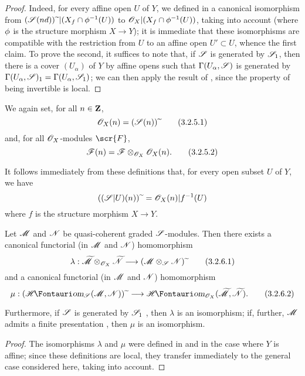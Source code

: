 \begin{proof}
Indeed, for every affine open $U$ of $Y$, we defined in  a canonical isomorphism from $(\mathscr{S}(nd)){\,\widetilde{\,}\,}|(X_f\cap\phi^{-1}(U))$ to $\mathscr{O}_X|(X_f\cap\phi^{-1}(U))$, taking  into account (where $\phi$ is the structure morphism $X\to Y$);
it is immediate that these isomorphisms are compatible with the restriction from $U$ to an affine open $U'\subset U$, whence the first claim.
To prove the second, it suffices to note that, if $\mathscr{S}$ is generated by $\mathscr{S}_1$, then there is a cover $(U_\alpha)$ of $Y$ by affine opens such that $\Gamma(U_\alpha,\mathscr{S})$ is generated by $\Gamma(U_\alpha,\mathscr{S})_1=\Gamma(U_\alpha,\mathscr{S}_1)$;
we can then apply the result of , since the property of being invertible is local.
\end{proof}

We again set, for all $n\in\mathbf{Z}$,
\[
\label{II.3.2.5.1}
  \mathscr{O}_X(n) = (\mathscr{S}(n)){\,\widetilde{\,}\,}
\tag{3.2.5.1}
\]
and, for all $\mathscr{O}_X$-modules $\scr{F}$,
\[
\label{II.3.2.5.2}
  \mathscr{F}(n) = \mathscr{F}\otimes_{\mathscr{O}_X}\mathscr{O}_X(n).
\tag{3.2.5.2}
\]

It follows immediately from these definitions that, for every open subset $U$ of $Y$, we have
\[
  ((\mathscr{S}|U)(n)){\,\widetilde{\,}\,} = \mathscr{O}_X(n)|f^{-1}(U)
\]
where $f$ is the structure morphism $X\to Y$.

\begin{proposition}[3.2.6]
\label{II.3.2.6}
Let $\mathscr{M}$ and $\mathscr{N}$ be quasi-coherent graded $\mathscr{S}$-modules.
Then there exists a canonical functorial (in $\mathscr{M}$ and $\mathscr{N}$) homomorphism
\[
\label{II.3.2.6.1}
  \lambda : \widetilde{\sh{M}}\otimes_{\sh{O}_X}\widetilde{\sh{N}} \to (\sh{M}\otimes_{\sh{S}}\sh{N})\supertilde
\tag{3.2.6.1}
\]
and a canonical functorial (in $\mathscr{M}$ and $\mathscr{N}$) homomorphism
\[
\label{II.3.2.6.2}
  \mu : (\shHom_{\sh{S}}(\sh{M},\sh{N}))\supertilde \to \shHom_{\sh{O}_X}(\widetilde{\sh{M}},\widetilde{\sh{N}}).
\tag{3.2.6.2}
\]

Furthermore, if $\mathscr{S}$ is generated by $\mathscr{S}_1$ , then $\lambda$ is an isomorphism;
if, further, $\mathscr{M}$ admits a finite presentation , then $\mu$ is an isomorphism.
\end{proposition}

\begin{proof}
The isomorphisms $\lambda$ and $\mu$ were defined in  and  in the case where $Y$ is affine;
since these definitions are local, they transfer immediately to the general case considered here, taking  into account.
\end{proof}

